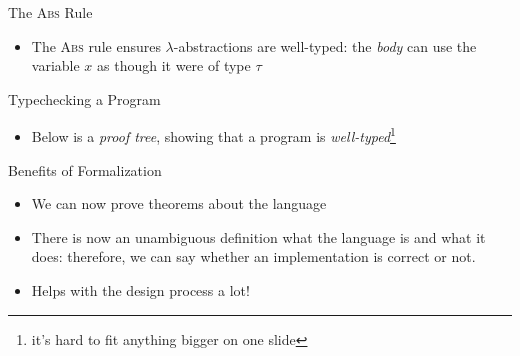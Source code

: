 \documentclass[leqno,presentation,usenames,dvipsnames]{beamer}
\begin{document}
\begin{frame}{The \textsc{Abs} Rule}
    \begin{itemize}
        \item The \textsc{Abs} rule ensures $\lambda$-abstractions are well-typed: the \emph{body} can use the variable $x$ as though it were of type $\tau$
    \end{itemize}

\begin{mathpar}
\end{mathpar}
\end{frame}

\begin{frame}{Typechecking a Program}
    \begin{itemize}
        \item Below is a \emph{proof tree}, showing that a program is \emph{well-typed}\footnote{it's hard to fit anything bigger on one slide}
    \end{itemize}

\begin{minipage}{\dimexpr\textwidth+3em\relax}
\small
\begin{mathpar}
\end{mathpar}
\end{minipage}%
\end{frame}

\begin{frame}{Benefits of Formalization}
    \begin{itemize}
        \item We can now prove theorems about the language
        \item There is now an unambiguous definition what the language is and what it does: therefore, we can say whether an implementation is correct or not.
        \item Helps with the design process a lot!
    \end{itemize}
\end{frame}
\end{document}
